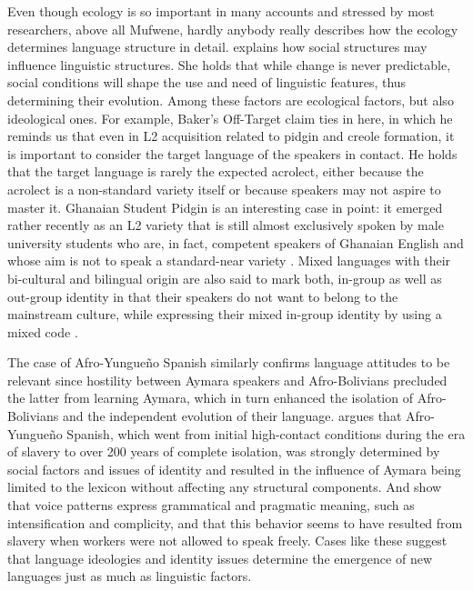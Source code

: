 \documentclass[output=paper,
modfonts
]{langscibook}
\begin{document}
Even though ecology is so important in many accounts and stressed by most researchers, above all Mufwene, hardly anybody really describes how the ecology determines language structure in detail. \cite{jourdan2008cultural} explains how social structures may influence linguistic structures. She holds that while change is never predictable, social conditions will shape the use and need of linguistic features, thus determining their evolution. Among these factors are ecological factors, but also ideological ones. For example, Baker’s \citeyear{baker1999investigating} Off-Target claim ties in here, in which he reminds us that even in L2 acquisition related to pidgin and creole formation, it is important to consider the target language of the speakers in contact. He holds that the target language is rarely the expected acrolect, either because the acrolect is a non-standard variety itself or because speakers may not aspire to master it. Ghanaian Student Pidgin is an interesting case in point: it emerged rather recently as an L2 variety that is still almost exclusively spoken by male university students who are, in fact, competent speakers of Ghanaian English and whose aim is not to speak a standard-near variety \citep{huber1999ghanaian, rupp2013function}. Mixed languages with their bi-cultural and bilingual origin are also said to mark both, in-group as well as out-group identity in that their speakers do not want to belong to the mainstream culture, while expressing their mixed in-group identity by using a mixed code \citep{muysken1997media}.

The case of Afro-Yungueño Spanish similarly confirms language attitudes to be relevant since hostility between Aymara speakers and Afro-Bolivians precluded the latter from learning Aymara, which in turn enhanced the isolation of Afro-Bolivians and the independent evolution of their language. \cite{perezFcsocial} argues that Afro-Yungueño Spanish, which went from initial high-contact conditions during the era of slavery to over 200 years of complete isolation, was strongly determined by social factors and issues of identity and resulted in the influence of Aymara being limited to the lexicon without affecting any structural components. And \cite{perezetal2019relevance} show that voice patterns express grammatical and pragmatic meaning, such as intensification and complicity, and that this behavior seems to have resulted from slavery when workers were not allowed to speak freely. Cases like these suggest that language ideologies and identity issues determine the emergence of new languages just as much as linguistic factors.
\end{document}
